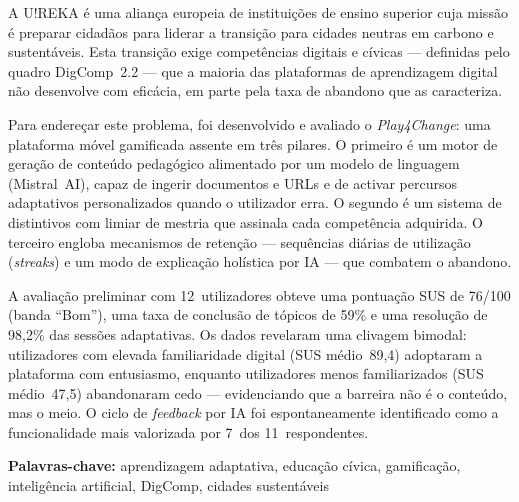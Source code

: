 \abstractPT  %

A U!REKA é uma aliança europeia de instituições de ensino superior cuja missão é preparar cidadãos para liderar a transição para cidades neutras em carbono e sustentáveis. Esta transição exige competências digitais e cívicas --- definidas pelo quadro DigComp~2.2 --- que a maioria das plataformas de aprendizagem digital não desenvolve com eficácia, em parte pela taxa de abandono que as caracteriza.

Para endereçar este problema, foi desenvolvido e avaliado o \emph{Play4Change}: uma plataforma móvel gamificada assente em três pilares. O primeiro é um motor de geração de conteúdo pedagógico alimentado por um modelo de linguagem (Mistral~AI), capaz de ingerir documentos e URLs e de activar percursos adaptativos personalizados quando o utilizador erra. O segundo é um sistema de distintivos com limiar de mestria que assinala cada competência adquirida. O terceiro engloba mecanismos de retenção --- sequências diárias de utilização (\emph{streaks}) e um modo de explicação holística por IA --- que combatem o abandono.

A avaliação preliminar com 12~utilizadores obteve uma pontuação SUS de 76/100 (banda ``Bom''), uma taxa de conclusão de tópicos de 59\% e uma resolução de 98,2\% das sessões adaptativas. Os dados revelaram uma clivagem bimodal: utilizadores com elevada familiaridade digital (SUS médio~89,4) adoptaram a plataforma com entusiasmo, enquanto utilizadores menos familiarizados (SUS médio~47,5) abandonaram cedo --- evidenciando que a barreira não é o conteúdo, mas o meio. O ciclo de \emph{feedback} por IA foi espontaneamente identificado como a funcionalidade mais valorizada por 7~dos 11~respondentes.

\vspace{0.5cm}
\noindent\textbf{Palavras-chave:} aprendizagem adaptativa, educação cívica, gamificação, inteligência artificial, DigComp, cidades sustentáveis
